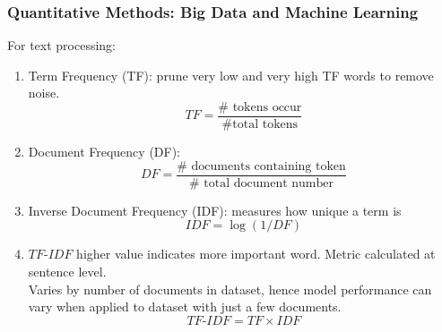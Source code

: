 \subsubsection{Quantitative Methods: Big Data and Machine Learning}

For text processing:
\begin{enumerate}[label=\roman*.]
\setlength{\itemsep}{0pt}
\item Term Frequency (TF): prune very low and very high TF words to remove noise.
\begin{equation}
TF = \frac{\# \text{ tokens occur}}{\# \text{total tokens}} \nonumber
\end{equation}
\item Document Frequency (DF):
\begin{equation}
DF = \frac{\# \text{ documents containing token}}{\# \text{ total document number}} \nonumber
\end{equation}
\item Inverse Document Frequency (IDF): measures how unique a term is
\begin{equation}
IDF = \log(1/DF) \nonumber
\end{equation}
\item $TF$-$IDF$ higher value indicates more important word. Metric calculated at sentence level.\\
Varies by number of documents in dataset, hence model performance can vary when applied to dataset with just a few documents.
\begin{equation}
TF\text{-}IDF = TF \times IDF \nonumber
\end{equation}
\end{enumerate}

